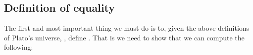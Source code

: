 \documentclass[a4paper,openany]{amsbook}
\begin{document}
\begin{prooftree}
\end{prooftree}

\begin{prooftree}
\end{prooftree}

\begin{prooftree}
\end{prooftree}

\begin{prooftree}
\end{prooftree}

\begin{prooftree}
\end{prooftree}

\subsection{Definition of equality}

The first and most important thing we must do is to, given the above definitions of
Plato's universe, \Universe{}{}, define .  That is we need to show that
we can compute the following:

\begin{prooftree}
\end{prooftree}
\end{document}

